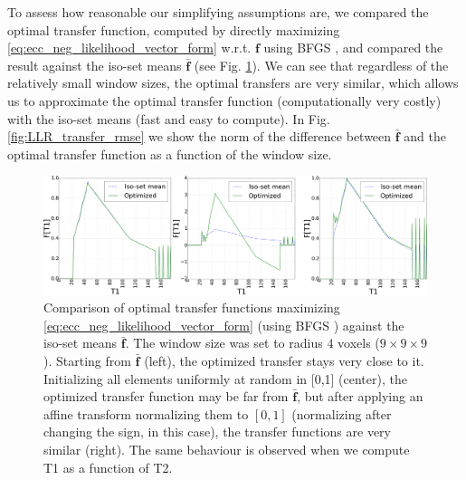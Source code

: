 To assess how reasonable our simplifying assumptions are, we compared the optimal transfer function, computed by directly maximizing \eqref{eq:ecc_neg_likelihood_vector_form} w.r.t. $\mathbf{f}$ using BFGS \cite{GVK502988711}, and compared the result against the iso-set means $\mathbf{\bar{f}}$ (see Fig. \ref{fig:comparison_optimal_transfers}). We can see that regardless of the relatively small window sizes, the optimal transfers are very similar, which allows us to approximate the optimal transfer function (computationally very costly) with the iso-set means (fast and easy to compute). In Fig. \ref{fig:LLR_transfer_rmse} we show the norm of the difference between $\mathbf{\bar{f}}$ and the optimal transfer function as a function of the window size. \\

\begin{figure}[t]
\centering
    \includegraphics[width=1.0\linewidth]{images/comparison_optimal_transfers_t1lab_3.png}
    \caption{{\small Comparison of optimal transfer functions maximizing \eqref{eq:ecc_neg_likelihood_vector_form} (using BFGS \cite{GVK502988711}) against the iso-set means $\mathbf{\bar{f}}$. The window size was set to radius $4$ voxels ($9\times 9\times 9$). Starting from $\mathbf{\bar{f}}$ (left), the optimized transfer stays very close to it. Initializing all elements uniformly at random in [0,1] (center), the optimized transfer function may be far from $\mathbf{\bar{f}}$, but after applying an affine transform normalizing them to $[0,1]$ (normalizing after changing the sign, in this case), the transfer functions are very similar (right). The same behaviour is observed when we compute T1 as a function of T2.}}
\label{fig:comparison_optimal_transfers}\figcloser
\end{figure}
